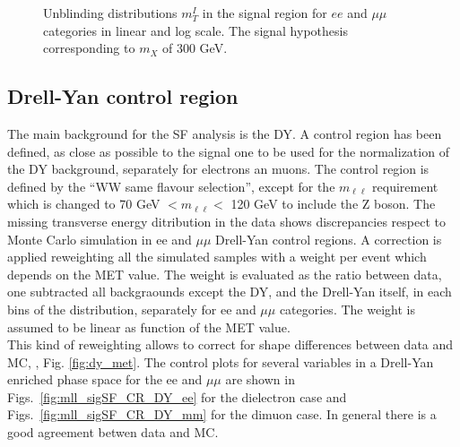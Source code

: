 \begin{figure}[htbp]
{}
\caption{Unblinding distributions  $m_T^I$ in the signal region for $ee$ and $\mu \mu$ categories in linear and log scale. The signal hypothesis corresponding to $m_X $ of 300 GeV.}
    \label{fig:mti_sigOF_Un}
\end{figure}




\newpage

\subsection*{Drell-Yan control region}
The main background for the SF analysis is the DY. 
A control region has been defined, as close as possible to the signal one to
be used for the normalization of the DY background, separately for electrons
an muons.
The control region is defined by the ``WW same flavour selection'', except for the
$m_{\ell \ell}$ requirement which is changed to 70 GeV $ <m_{\ell \ell} <$ 120
GeV to include the Z boson.
The missing transverse energy ditribution in the data shows discrepancies respect to Monte Carlo simulation  in ee and $\mu \mu$ Drell-Yan control regions. A correction is applied reweighting all the simulated samples with a weight per event which depends on the MET value. 
The weight is evaluated as the ratio between data, one subtracted all backgraounds except the DY, and the Drell-Yan itself, in each bins of the distribution, separately for ee and $\mu \mu$ categories. The weight is assumed to be linear as function of the MET value.\\
This kind of reweighting allows to correct for shape differences between data and MC, , Fig. \ref{fig:dy_met}.
The control plots for several variables in a Drell-Yan enriched phase space
for the ee and $\mu \mu$ are shown in Figs.~\ref{fig:mll_sigSF_CR_DY_ee} for
the dielectron case and Figs.~\ref{fig:mll_sigSF_CR_DY_mm} for the dimuon
case. In general there is a good agreement betwen data and MC.

